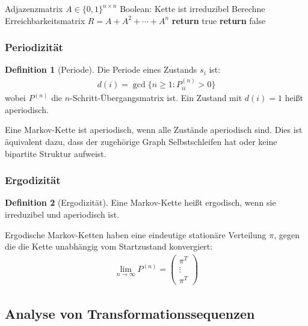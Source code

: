 \documentclass[a4paper,12pt]{article}
\theoremstyle{definition}
\newtheorem{definition}{Definition}
\begin{document}
\begin{algorithm}[H]
	\caption{Prüfung der Irreduzibilität}
	\begin{algorithmic}[1]
		\Require Adjazenzmatrix $A \in \{0,1\}^{n \times n}$
		\Ensure Boolean: Kette ist irreduzibel
		\State Berechne Erreichbarkeitsmatrix $R = A + A^2 + \cdots + A^n$
		\State \textbf{return} true 
		\Else
		\State \textbf{return} false 
		\EndIf
	\end{algorithmic}
\end{algorithm}

\subsubsection{Periodizität}

\begin{definition}[Periode]
	Die Periode eines Zustands $s_i$ ist:
	\begin{align}
		d(i) = \gcd\{n \geq 1 : P_{ii}^{(n)} > 0\}
	\end{align}
	wobei $P^{(n)}$ die $n$-Schritt-Übergangsmatrix ist. Ein Zustand mit $d(i) = 1$ heißt aperiodisch.
\end{definition}

Eine Markov-Kette ist aperiodisch, wenn alle Zustände aperiodisch sind. Dies ist äquivalent dazu, dass der zugehörige Graph Selbstschleifen hat oder keine bipartite Struktur aufweist.

\subsubsection{Ergodizität}

\begin{definition}[Ergodizität]
	Eine Markov-Kette heißt ergodisch, wenn sie irreduzibel und aperiodisch ist.
\end{definition}

Ergodische Markov-Ketten haben eine eindeutige stationäre Verteilung $\pi$, gegen die die Kette unabhängig vom Startzustand konvergiert:
\begin{align}
	\lim_{n \rightarrow \infty} P^{(n)} = \begin{pmatrix}
		\pi^T \\
		\vdots \\
		\pi^T
	\end{pmatrix}
\end{align}

\subsection{Analyse von Transformationssequenzen}
\end{document}
